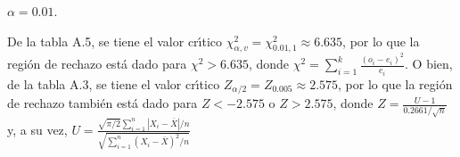 \begin{solucion}
 \begin{significancia}
  $\alpha = 0.01$.
 \end{significancia}

 \begin{region}
  De la tabla A.5, se tiene el valor cr\'{\i}tico
  $\chi^2_{\alpha,v} = \chi^2_{0.01,1} \approx 6.635$,
  por lo que la regi\'on de rechazo est\'a dado
  para $\chi^2 > 6.635$, donde
  $\chi^2 = \sum_{i=1}^{k} \frac{\left( o_i - e_i \right)^2}{e_i}$.
  O bien, de la tabla A.3, se tiene el valor cr\'{\i}tico
  $Z_{\alpha/2} = Z_{0.005} \approx 2.575$,
  por lo que la regi\'on de rechazo tambi\'en est\'a dado
  para $Z < -2.575$ o $Z > 2.575$,
  donde $Z = \frac{U - 1}{0.2661/\sqrt{n}}$ y, a su vez,
  $U = \frac{\sqrt{\pi/2} \sum_{i=1}^{n} \left| X_i - \overline{X} \right|/n}{
  \sqrt{\sum_{i=1}^n \left( X_i - \overline{X} \right)^2/n}}$
 \end{region}


\end{solucion}
